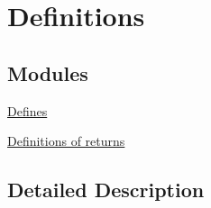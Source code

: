 \hypertarget{group___u_c_l___d_e_f_i_n_i_t_i_o_n_s}{}\section{Definitions}
\label{group___u_c_l___d_e_f_i_n_i_t_i_o_n_s}
\subsection*{Modules}
\begin{DoxyCompactItemize}
\item 
\hyperlink{group___u_c_l___d_e_f_i_n_e_s}{Defines}
\item 
\hyperlink{group___u_c_l___r_e_t_u_r_n}{Definitions of returns}
\end{DoxyCompactItemize}


\subsection{Detailed Description}
